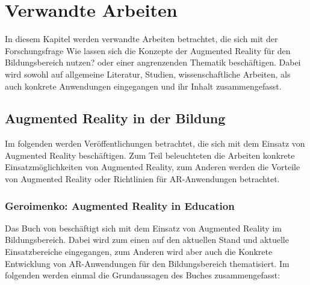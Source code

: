 \chapter{Verwandte Arbeiten}\label{chapter:arbeiten}
In diesem Kapitel werden verwandte Arbeiten betrachtet, die sich mit der Forschungsfrage \glqq Wie lassen sich die Konzepte der Augmented Reality für den Bildungsbereich nutzen?\grqq{} oder einer angrenzenden Thematik beschäftigen. Dabei wird sowohl auf allgemeine Literatur, Studien, wissenschaftliche Arbeiten, als auch konkrete Anwendungen eingegangen und ihr Inhalt zusammengefasst.


\section{Augmented Reality in der Bildung}
Im folgenden werden Veröffentlichungen betrachtet, die sich mit dem Einsatz von Augmented Reality beschäftigen. Zum Teil beleuchteten die Arbeiten konkrete Einsatzmöglichkeiten von Augmented Reality, zum Anderen werden die Vorteile von Augmented Reality oder Richtlinien für AR-Anwendungen betrachtet.


\subsection{Geroimenko: Augmented Reality in Education}
Das Buch \citep{geroimenko:ar-in-education} von \citeauthor{geroimenko:ar-in-education} beschäftigt sich mit dem Einsatz von Augmented Reality im Bildungsbereich. Dabei wird zum einen auf den aktuellen Stand und aktuelle Einsatzbereiche eingegangen, zum Anderen wird aber auch die Konkrete Entwicklung von AR-Anwendungen für den Bildungsbereich thematisiert. Im folgenden werden einmal die Grundaussagen des Buches zusammengefasst:

